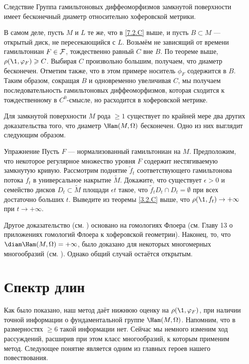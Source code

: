 \begin{thm}{Следствие}\label{7.2.D} Группа гамильтоновых диффеоморфизмов замкнутой поверхности имеет бесконечный диаметр относительно хоферовской метрики.
\end{thm}

В самом деле, пусть $M$ и $L$ те же, что в \ref{7.2.C} выше, и пусть $B \subset M$ — открытый диск, не пересекающийся с $L$.
Возьмём не зависящий от времени гамильтониан $F \in \mathcal{F}$, тождественно равный $C$ вне $B$.
По теореме выше, $\rho (\1, \phi_F) \ge C$.
Выбирая $C$ произвольно большим, получаем, что диаметр бесконечен.
Отметим также, что в этом примере носитель $\phi_F$ содержится в $B$.
Таким образом, сокращая $B$ и одновременно увеличивая $C$, мы получаем
последовательность гамильтоновых диффеоморфизмов, которая сходится к
тождественному в $C^0$-смысле, но расходится в хоферовской метрике. 

Для замкнутой поверхности $M$ рода $\ge 1$ существует по крайней мере
два других доказательства того, что диаметр $\Ham (M, \Omega)$
бесконечен. 
Одно из них выглядит следующим образом. 

\begin{ex}[см. \cite{LM2}.]{Упражнение} \label{7.2.E}
Пусть $F$ — нормализованный гамильтониан на $M$.
Предположим, что некоторое регулярное множество уровня $F$ содержит нестягиваемую замкнутую кривую. 
Рассмотрим поднятие $\tilde f_t$ соответствующего гамильтонова потока $f_t$ в универсальное накрытие $\tilde M$. 
Докажите, что существует $\epsilon> 0$ и семейство дисков $D_t \subset \tilde M$ площади $\epsilon t$ такое, что $\tilde f_t D_t \cap D_t = \emptyset$ при всех достаточно больших $t$. 
Выведите из теоремы \ref{3.2.C} выше, что $\rho (\1, f_t) \to + \infty$ при $t \to + \infty$. 
\end{ex}

Другое доказательство (см. \cite{Sch3}) основано на гомологиях Флоера (см. Главу 13 о приложениях гомологий Флоера к хоферовской геометрии).
Наконец, то, что $\diam \Ham (M, \Omega) = + \infty$, было доказано для некоторых многомерных многообразий (см. \cite{LM2,Sch3,P5}).
Однако общий случай остаётся открытым.

\section{Спектр длин}\label{sec:7.3}

Как было показано, наш метод даёт нижнюю оценку на $\rho (\1, \phi_F)$, при наличии точной информации о фундаментальной группе $\Ham (M, \Omega)$.
Напомним, что в размерностях $\ge 6$ такой информации нет.
Сейчас мы немного изменим ход рассуждений, расширив при этом класс многообразий, к которым применим метод.
Следующее понятие является одним из главных героев нашего повествования.

